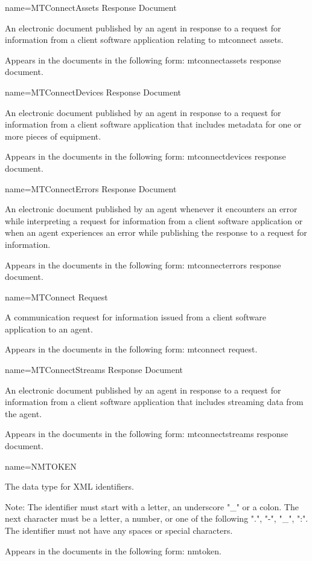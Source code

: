 {
  name={MTConnectAssets Response Document}
}
{
	An electronic document published by an \gls{agent} in response to a \gls{request} for information from a client software application relating to \glspl{mtconnect asset}.

	Appears in the documents in the following form: \gls{mtconnectassets response document}.
}


{
  name={MTConnectDevices Response Document}
}
{
	An electronic document published by an \gls{agent} in response to a \gls{request} for information from a client software application that includes \gls{metadata} for one or more pieces of equipment.

	Appears in the documents in the following form: \gls{mtconnectdevices response document}.
}


{
  name={MTConnectErrors Response Document}
}
{
	An electronic document published by an \gls{agent} whenever it encounters an error while interpreting a \gls{request} for information from a client software application or when an \gls{agent} experiences an error while publishing the \gls{response} to a \gls{request} for information.

	Appears in the documents in the following form: \gls{mtconnecterrors response document}.
}


{
  name={MTConnect Request}
}
{
	A communication request for information issued from a client software application to an \gls{agent}.

	Appears in the documents in the following form: \gls{mtconnect request}.
}


{
  name={MTConnectStreams Response Document}
}
{
	An electronic document published by an \gls{agent} in response to a \gls{request} for information from a client software application that includes \gls{streaming data} from the \gls{agent}.

	Appears in the documents in the following form: \gls{mtconnectstreams response document}.
}


{
  name={NMTOKEN}
}
{
	The data type for XML identifiers.

	Note: The identifier must start with a letter, an underscore "\_" or a colon.  The next character must be a letter, a number, or one of the following ".", "-", "\_", ":".  The identifier must not have any spaces or special characters.

	Appears in the documents in the following form: \gls{nmtoken}.
}


